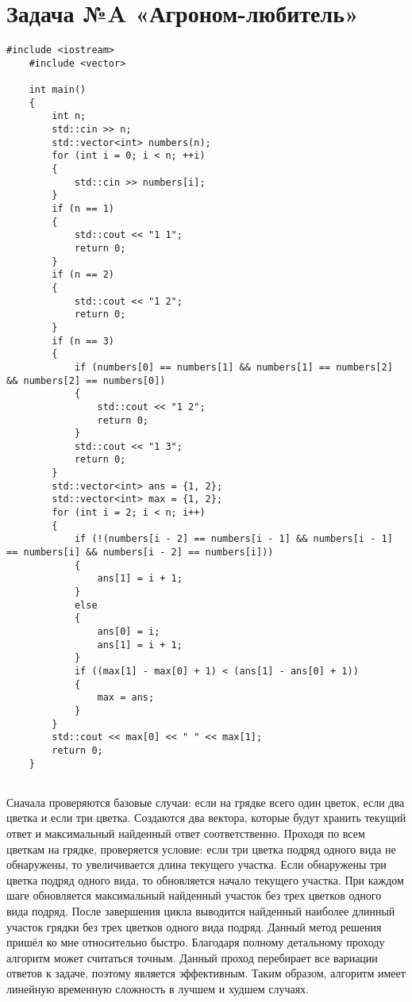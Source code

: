 \documentclass{article}
\begin{document}
\section{Задача №A «Агроном-любитель»}
\begin{lstlisting}[frame=single, basicstyle=\ttfamily, breaklines=true, breakatwhitespace=true, postbreak=\mbox{\textcolor{red}{$\hookrightarrow$}\space}]
    #include <iostream>
    #include <vector>
    
    int main()
    {
        int n;
        std::cin >> n;
        std::vector<int> numbers(n);
        for (int i = 0; i < n; ++i)
        {
            std::cin >> numbers[i];
        }
        if (n == 1)
        {
            std::cout << "1 1";
            return 0;
        }
        if (n == 2)
        {
            std::cout << "1 2";
            return 0;
        }
        if (n == 3)
        {
            if (numbers[0] == numbers[1] && numbers[1] == numbers[2] && numbers[2] == numbers[0])
            {
                std::cout << "1 2";
                return 0;
            }
            std::cout << "1 3";
            return 0;
        }
        std::vector<int> ans = {1, 2};
        std::vector<int> max = {1, 2};
        for (int i = 2; i < n; i++)
        {
            if (!(numbers[i - 2] == numbers[i - 1] && numbers[i - 1] == numbers[i] && numbers[i - 2] == numbers[i]))
            {
                ans[1] = i + 1;
            }
            else
            {
                ans[0] = i;
                ans[1] = i + 1;
            }
            if ((max[1] - max[0] + 1) < (ans[1] - ans[0] + 1))
            {
                max = ans;
            }
        }
        std::cout << max[0] << " " << max[1];
        return 0;
    }
    
\end{lstlisting}
Сначала проверяются базовые случаи: если на грядке всего один цветок, если два цветка и если три цветка.
Создаются два вектора, которые будут хранить текущий ответ и максимальный найденный ответ соответственно.
Проходя по всем цветкам на грядке, проверяется условие: если три цветка подряд одного вида не обнаружены, то увеличивается длина текущего участка. 
Если обнаружены три цветка подряд одного вида, то обновляется начало текущего участка.
При каждом шаге обновляется максимальный найденный участок без трех цветков одного вида подряд.
После завершения цикла выводится найденный наиболее длинный участок грядки без трех цветков одного вида подряд.
Данный метод решения пришёл ко мне относительно быстро. Благодаря полному детальному проходу алгоритм может считаться точным.
Данный проход перебирает все вариации ответов к задаче, поэтому является эффективным. Таким образом, алгоритм имеет линейную временную сложность в лучшем и худшем случаях.
\end{document}
